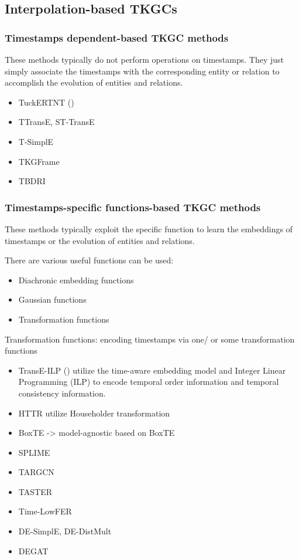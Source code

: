 \documentclass[12pt]{article}
\begin{document}
\subsection{Interpolation-based TKGCs}

\subsubsection{Timestamps dependent-based TKGC methods}

These methods typically do not perform operations on timestamps. They just simply
associate the timestamps with the corresponding entity or relation to accomplish
the evolution of entities and relations.

\begin{itemize}
    \item TuckERTNT (\cite{shao2022tucker})
    \item TTransE, ST-TransE
    \item T-SimplE
    \item TKGFrame
    \item TBDRI
\end{itemize}

\subsubsection{Timestamps-specific functions-based TKGC methods}

These methods typically exploit the specific function to learn the embeddings of 
timestamps or the evolution of entities and relations.

There are various useful functions can be used:
\begin{itemize}
    \item Diachronic embedding functions
    \item Gaussian functions 
    \item Transformation functions 
\end{itemize}

Transformation functions: encoding timestamps via one/ or some transformation functions
\begin{itemize}
    \item TransE-ILP (\cite{jiang-etal-2016-towards}) utilize the time-aware embedding model and Integer Linear Programming (ILP) to encode temporal order information and temporal consistency information.
    \item HTTR utilize Householder transformation
    \item BoxTE -> model-agnostic based on BoxTE
    \item SPLIME
    \item TARGCN
    \item TASTER
    \item Time-LowFER
    \item DE-SimplE, DE-DistMult
    \item DEGAT
\end{itemize}
\end{document}
